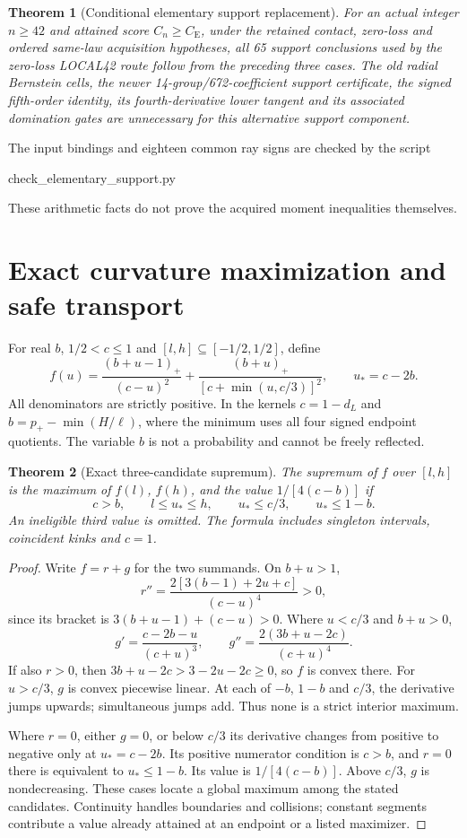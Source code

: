 \documentclass[11pt]{article}
\newtheorem{theorem}{Theorem}
\newcommand{\CE}{C_{\mathrm E}}
\newcommand{\pos}[1]{(#1)_+}
\begin{document}
\begin{theorem}[Conditional elementary support replacement]
For an actual integer $n\ge42$ and attained score $C_n\ge\CE$, under the
retained contact, zero-loss and ordered same-law acquisition
hypotheses, all 65 support conclusions used by the zero-loss LOCAL42 route
follow from the preceding three cases. The old radial Bernstein cells,
the newer 14-group/672-coefficient support certificate, the signed
fifth-order identity, its fourth-derivative lower tangent and its associated
domination gates are unnecessary for this alternative support component.
\end{theorem}
The input bindings and eighteen common ray signs are checked by the script
\begin{center}\ttfamily check\_elementary\_support.py\end{center}
These arithmetic facts do not prove
the acquired moment inequalities themselves.

\section{Exact curvature maximization and safe transport}
For real $b$, $1/2<c\le1$ and $[l,h]\subseteq[-1/2,1/2]$, define
\[
 f(u)=\frac{\pos{b+u-1}}{(c-u)^2}
       +\frac{\pos{b+u}}{[c+\min(u,c/3)]^2},\qquad u_*=c-2b.
\]
All denominators are strictly positive. In the kernels $c=1-d_L$ and
$b=p_+-\min(H/\ell)$, where the minimum uses all four signed endpoint
quotients. The variable $b$ is not a probability and cannot be freely
reflected.

\begin{theorem}[Exact three-candidate supremum]
The supremum of $f$ over $[l,h]$ is the maximum of $f(l)$, $f(h)$, and
the value $1/[4(c-b)]$ if
\[
 c>b,\qquad l\le u_*\le h,\qquad
 u_*\le c/3,\qquad u_*\le1-b.
\]
An ineligible third value is omitted. The formula includes singleton
intervals, coincident kinks and $c=1$.
\end{theorem}
\begin{proof}
Write $f=r+g$ for the two summands. On $b+u>1$,
\[
 r''=\frac{2[3(b-1)+2u+c]}{(c-u)^4}>0,
\]
since its bracket is $3(b+u-1)+(c-u)>0$. Where $u<c/3$ and $b+u>0$,
\[
 g'=\frac{c-2b-u}{(c+u)^3},\qquad
 g''=\frac{2(3b+u-2c)}{(c+u)^4}.
\]
If also $r>0$, then $3b+u-2c>3-2u-2c\ge0$, so $f$ is convex there.
For $u>c/3$, $g$ is convex piecewise linear. At each of
$-b$, $1-b$ and $c/3$, the derivative jumps upwards; simultaneous jumps
add. Thus none is a strict interior maximum.

Where $r=0$, either $g=0$, or below $c/3$ its derivative changes from
positive to negative only at $u_*=c-2b$. Its positive numerator condition
is $c>b$, and $r=0$ there is equivalent to $u_*\le1-b$.
Its value is $1/[4(c-b)]$. Above $c/3$, $g$ is nondecreasing.
These cases locate a global maximum among the stated candidates.
Continuity handles boundaries and collisions; constant segments contribute
a value already attained at an endpoint or a listed maximizer.
\end{proof}
\end{document}
